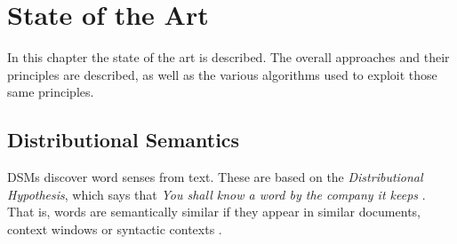 \chapter{State of the Art}
\label{ch:stateofart}

In this chapter the state of the art is described. The overall approaches and
their principles are described, as well as the various algorithms used to
exploit those same principles.

\section{Distributional Semantics}

\acp{DSM} discover word senses from text. These are based on the 
\textit{Distributional Hypothesis}, which says that \textit{You shall know a 
word by the company it keeps} \citep{firth1957papers}. That is, words are 
semantically similar if they appear in similar documents, context windows or 
syntactic contexts \citep{van2010mining}.







